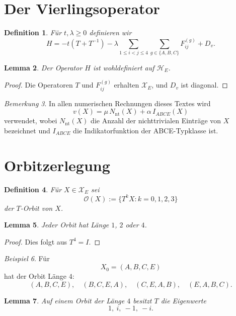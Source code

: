 \documentclass[11pt,a4paper]{article}
\newtheorem{definition}{Definition}[section]
\newtheorem{lemma}[definition]{Lemma}
\theoremstyle{remark}
\newtheorem{remark}[definition]{Bemerkung}
\newtheorem{example}[definition]{Beispiel}
\newcommand{\XE}{\mathcal X_E}
\newcommand{\HE}{\mathcal H_E}
\begin{document}
	\section{Der Vierlingsoperator}
	
	\begin{definition}
		Für \(t,\lambda\ge 0\) definieren wir
		\[
		H
		=
		-t(T+T^{-1})
		-\lambda\sum_{1\le i<j\le 4}\sum_{g\in\{A,B,C\}}F_{ij}^{(g)}
		+D_v.
		\]
	\end{definition}
	
	\begin{lemma}
		Der Operator \(H\) ist wohldefiniert auf \(\HE\).
	\end{lemma}
	
	\begin{proof}
		Die Operatoren \(T\) und \(F_{ij}^{(g)}\) erhalten \(\XE\), und \(D_v\) ist diagonal.
	\end{proof}
	
	\begin{remark}
		In allen numerischen Rechnungen dieses Textes wird
		\[
		v(X)=\mu\,N_{\mathrm{nt}}(X)+\alpha\,I_{ABCE}(X)
		\]
		verwendet, wobei \(N_{\mathrm{nt}}(X)\) die Anzahl der nichttrivialen Einträge von \(X\) bezeichnet und \(I_{ABCE}\) die Indikatorfunktion der ABCE-Typklasse ist.
	\end{remark}
	
	\section{Orbitzerlegung}
	
	\begin{definition}
		Für \(X\in\XE\) sei
		\[
		\mathcal O(X):=\{T^kX:k=0,1,2,3\}
		\]
		der \(T\)-Orbit von \(X\).
	\end{definition}
	
	\begin{lemma}
		Jeder Orbit hat Länge \(1\), \(2\) oder \(4\).
	\end{lemma}
	
	\begin{proof}
		Dies folgt aus \(T^4=I\).
	\end{proof}
	
	\begin{example}
		Für
		\[
		X_0=(A,B,C,E)
		\]
		hat der Orbit Länge \(4\):
		\[
		(A,B,C,E),\quad (B,C,E,A),\quad (C,E,A,B),\quad (E,A,B,C).
		\]
	\end{example}
	
	\begin{lemma}
		Auf einem Orbit der Länge \(4\) besitzt \(T\) die Eigenwerte
		\[
		1,\ i,\ -1,\ -i.
		\]
	\end{lemma}
	
\end{document}
